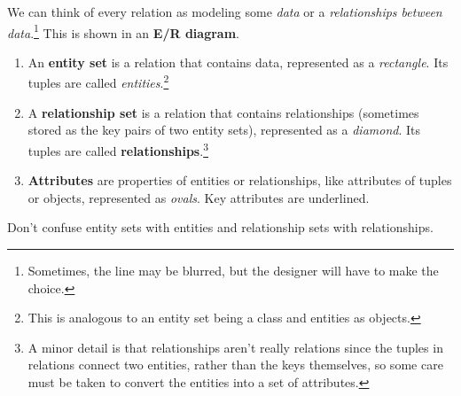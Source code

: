 \documentclass{article}
\begin{document}
      \begin{definition} 
        We can think of every relation as modeling some \textit{data} or a \textit{relationships between data}.\footnote{Sometimes, the line may be blurred, but the designer will have to make the choice.} This is shown in an \textbf{E/R diagram}. 
        \begin{enumerate}
          \item An \textbf{entity set} is a relation that contains data, represented as a \textit{rectangle}. Its tuples are called \textit{entities}.\footnote{This is analogous to an entity set being a class and entities as objects.} 
          \item A \textbf{relationship set} is a relation that contains relationships (sometimes stored as the key pairs of two entity sets), represented as a \textit{diamond}. Its tuples are called \textbf{relationships}.\footnote{A minor detail is that relationships aren't really relations since the tuples in relations connect two entities, rather than the keys themselves, so some care must be taken to convert the entities into a set of attributes. }
          \item \textbf{Attributes} are properties of entities or relationships, like attributes of tuples or objects, represented as \textit{ovals}. Key attributes are underlined. 
        \end{enumerate}
        Don't confuse entity sets with entities and relationship sets with relationships. 
      \end{definition}
\end{document}
